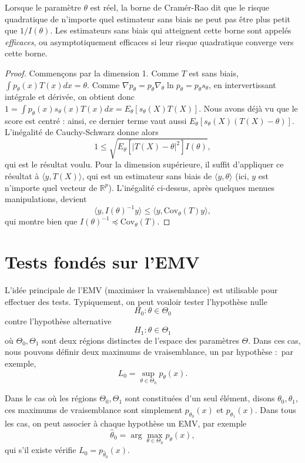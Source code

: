 \documentclass[
  10,
  letterpaper,
  DIV=11,
  numbers=noendperiod]{scrreport}
\theoremstyle{plain}
\theoremstyle{definition}
\theoremstyle{plain}
\theoremstyle{definition}
\theoremstyle{definition}
\theoremstyle{plain}
\theoremstyle{remark}
\begin{document}
Lorsque le paramètre \(\theta\) est réel, la borne de Cramér-Rao dit que
le risque quadratique de n'importe quel estimateur sans biais ne peut
pas être plus petit que \(1/I(\theta)\). Les estimateurs sans biais qui
atteignent cette borne sont appelés \emph{efficaces}, ou
asymptotiquement efficaces si leur risque quadratique converge vers
cette borne.

\begin{proof}

Commençons par la dimension 1. Comme \(T\) est sans biais,
\(\int p_\theta(x)T(x)dx=\theta\). Comme
\(\nabla p_\theta = p_\theta \nabla_\theta \ln p_\theta = p_\theta s_\theta\),
en intervertissant intégrale et dérivée, on obtient donc
\(1 = \int p_\theta (x)s_\theta(x)T(x)dx = E_\theta[s_\theta(X)T(X)]\).
Nous avons déjà vu que le score est centré : ainsi, ce dernier terme
vaut aussi \(E_\theta[s_\theta(X)(T(X) - \theta)]\). L'inégalité de
Cauchy-Schwarz donne alors
\[1 \leqslant \sqrt{E_\theta[|T(X)-\theta|^2]I(\theta)}, \] qui est le
résultat voulu. Pour la dimension supérieure, il suffit d'appliquer ce
résultat à \(\langle y, T(X)\rangle\), qui est un estimateur sans biais
de \(\langle y, \theta \rangle\) (ici, \(y\) est n'importe quel vecteur
de \(\mathbb{R}^p\)). L'inégalité ci-dessus, après quelques menues
manipulations, devient
\[\langle y, I(\theta)^{-1}y\rangle \leqslant \langle y, \mathrm{Cov}_\theta(T)y\rangle, \]
qui montre bien que \(I(\theta)^{-1} \preceq \mathrm{Cov}_\theta(T)\).

\end{proof}

\hypertarget{tests-fonduxe9s-sur-lemv}{%
\section{Tests fondés sur l'EMV}\label{tests-fonduxe9s-sur-lemv}}

L'idée principale de l'EMV (maximiser la vraisemblance) est utilisable
pour effectuer des tests. Typiquement, on peut vouloir tester
l'hypothèse nulle \[ H_0 : \theta \in \Theta_0\] contre l'hypothèse
alternative \[ H_1 : \theta \in \Theta_1\] où \(\Theta_0,\Theta_1\) sont
deux régions distinctes de l'espace des paramètres \(\Theta\). Dans ces
cas, nous pouvons définir deux maximums de vraisemblance, un par
hypothèse :~par exemple,
\[ L_0 =  \sup_{\theta \in \Theta_0} p_\theta(x).\]

Dans le cas où les régions \(\Theta_0,\Theta_1\) sont constituées d'un
seul élément, disons \(\theta_0,\theta_1\), ces maximums de
vraisemblance sont simplement \(p_{\theta_0}(x)\) et
\(p_{\theta_1}(x)\). Dans tous les cas, on peut associer à chaque
hypothèse un EMV, par exemple
\[ \hat{\theta}_0 = \arg \max_{\theta \in \Theta_0} p_\theta(x),\] qui
s'il existe vérifie \(L_0 = p_{\hat{\theta}_0}(x)\).
\end{document}
